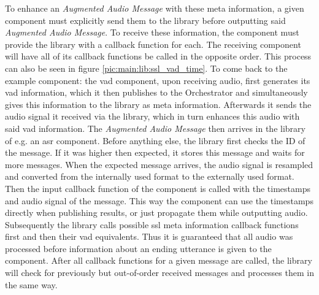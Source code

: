 To enhance an \textit{Augmented Audio Message} with these meta information, a given component must explicitly send them to the library before outputting said \textit{Augmented Audio Message}.
To receive these information, the component must provide the library with a callback function for each.
The receiving component will have all of its callback functions be called in the opposite order.
This process can also be seen in figure \ref{pic:main:lib:ssl_vad_time}.
To come back to the example component:
the \gls{vad} component, upon receiving audio, first generates its \gls{vad} information, which it then publishes to the Orchestrator and simultaneously gives this information to the library as meta information.
Afterwards it sends the audio signal it received via the library, which in turn enhances this audio with said \gls{vad} information.
The \textit{Augmented Audio Message} then arrives in the library of e.g. an \gls{asr} component.
Before anything else, the library first checks the ID of the message.
If it was higher then expected, it stores this message and waits for more messages.
When the expected message arrives, the audio signal is resampled and converted from the internally used format to the externally used format.
Then the input callback function of the component is called with the timestamps and audio signal of the message.
This way the component can use the timestamps directly when publishing results, or just propagate them while outputting audio.
Subsequently the library calls possible \gls{ssl} meta information callback functions first and then their \gls{vad} equivalents.
Thus it is guaranteed that all audio was processed before information about an ending utterance is given to the component. 
After all callback functions for a given message are called, the library will check for previously but out-of-order received messages and processes them in the same way.




